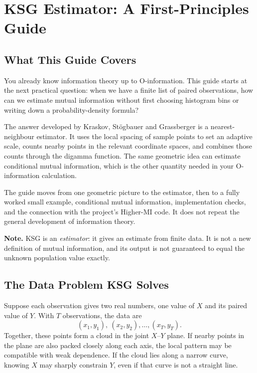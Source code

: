 \documentclass[11pt,letterpaper,oneside]{report}
\newcommand{\KSG}{\textsc{KSG}}
\newcommand{\Note}[1]{\par\noindent\colorbox{notegray}{\parbox{0.965\linewidth}{\textbf{Note.} #1}}\par}
\begin{document}
\chapter{KSG Estimator: A First-Principles Guide}

\section{What This Guide Covers}

You already know information theory up to O-information. This guide starts at the next practical question: when we have a finite list of paired observations, how can we estimate mutual information without first choosing histogram bins or writing down a probability-density formula?

The answer developed by Kraskov, St\"ogbauer and Grassberger is a nearest-neighbour estimator. It uses the local spacing of sample points to set an adaptive scale, counts nearby points in the relevant coordinate spaces, and combines those counts through the digamma function. The same geometric idea can estimate conditional mutual information, which is the other quantity needed in your O-information calculation.

The guide moves from one geometric picture to the estimator, then to a fully worked small example, conditional mutual information, implementation checks, and the connection with the project's Higher-MI code. It does not repeat the general development of information theory.

\Note{\KSG{} is an \emph{estimator}: it gives an estimate from finite data. It is not a new definition of mutual information, and its output is not guaranteed to equal the unknown population value exactly.}

\section{The Data Problem KSG Solves}

Suppose each observation gives two real numbers, one value of $X$ and its paired value of $Y$. With $T$ observations, the data are
\[
  (x_1,y_1),\ (x_2,y_2),\ldots,(x_T,y_T).
\]
Together, these points form a cloud in the joint $X$--$Y$ plane. If nearby points in the plane are also packed closely along each axis, the local pattern may be compatible with weak dependence. If the cloud lies along a narrow curve, knowing $X$ may sharply constrain $Y$, even if that curve is not a straight line.
\end{document}
